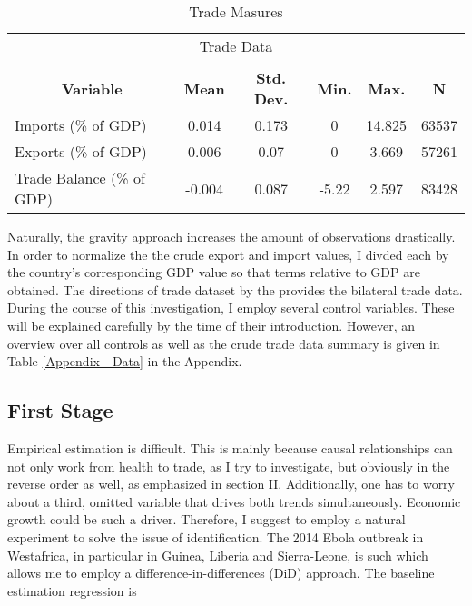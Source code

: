\documentclass{article}
\begin{document}
\begin{table}[htbp]\centering \caption{Trade Masures \label{Trade Measures}}
\begin{tabular}{l c c c c c}\hline\hline
\multicolumn{6}{c}{Trade Data}\\ \\ \hline
\multicolumn{1}{c}{\textbf{Variable}} & \textbf{Mean}
 & \textbf{Std. Dev.}& \textbf{Min.} &  \textbf{Max.} & \textbf{N}\\ \hline
Imports (\% of GDP) & 0.014 & 0.173 & 0 & 14.825 & 63537\\
Exports (\% of GDP) & 0.006 & 0.07 & 0 & 3.669 & 57261\\
Trade Balance (\% of GDP) & -0.004 & 0.087 & -5.22 & 2.597 & 83428\\
\hline\end{tabular}
\end{table}
Naturally, the gravity approach increases the amount of observations drastically. In order to normalize the the crude export and import values, I divded each by the country's corresponding GDP value so that terms relative to GDP are obtained. The directions of trade dataset by the \cite{imfdot} provides the bilateral trade data. \\
During the course of this investigation, I employ several control variables. These will be explained carefully by the time of their introduction. However, an overview over all controls as well as the crude trade data summary is given in Table \ref{Appendix - Data} in the Appendix.

\subsection{First Stage}

Empirical estimation is difficult. This is mainly because causal relationships can not only work from health to trade, as I try to investigate, but obviously in the reverse order as well, as emphasized in section II. Additionally, one has to worry about a third, omitted variable that drives both trends simultaneously. Economic growth could be such a driver. Therefore, I suggest to employ a natural experiment to solve the issue of identification. The 2014 Ebola outbreak in Westafrica, in particular in Guinea, Liberia and Sierra-Leone, is such which allows me to employ a difference-in-differences (DiD) approach.
The baseline estimation regression is
\end{document}
